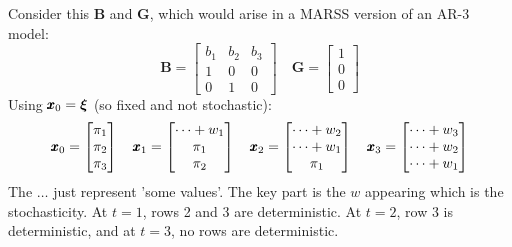 \documentclass[]{article}
\def\xixi{\mbox{\boldmath $\xi$}}
\def\BB{\mbox{$\mathbf B$}}	\def\bb{\mbox{$\mathbf b$}}
\def\GG{\mbox{$\mathbf G$}}	\def\gg{\mbox{$\mathbf g$}}
\begin{document}
Consider this $\BB$ and $\GG$, which would arise in a MARSS version of an AR-3 model:
\begin{equation}
\BB=\begin{bmatrix}
b_1&b_2&b_3\\
1&0&0\\
0&1&0\end{bmatrix}
\quad
\GG=\begin{bmatrix}
1\\
0\\
0\end{bmatrix}
\end{equation}
Using $\xx_0=\xixi$ (so fixed and not stochastic):
\begin{equation}
\mbox{$\pmb{x}$}_0=\begin{bmatrix}
\pi_1\\
\pi_2\\
\pi_3
\end{bmatrix}
\quad
\mbox{$\pmb{x}$}_1=\begin{bmatrix}
\dots+w_1\\
\pi_1\\
\pi_2
\end{bmatrix}
\quad
\mbox{$\pmb{x}$}_2=\begin{bmatrix}
\dots+w_2\\
\dots+w_1\\
\pi_1\end{bmatrix}
\quad
\mbox{$\pmb{x}$}_3=\begin{bmatrix}
\dots+w_3\\
\dots+w_2\\
\dots+w_1
\end{bmatrix}
\end{equation}
The $\dots$ just represent 'some values'.  The key part is the $w$ appearing which is the stochasticity.  At $t=1$, rows 2 and 3 are deterministic.  At $t=2$, row 3 is deterministic, and at $t=3$, no rows are deterministic.
\end{document}
